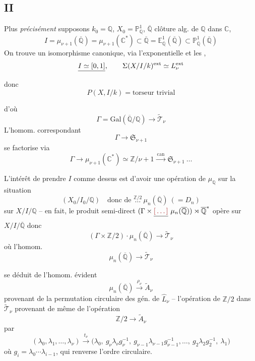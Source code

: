 \documentclass[11pt,a4paper]{article}
\begin{document}
\subsection*{II}

Plus \emph{précisément} supposons $k_{0} = \mathbb{Q}$,
$X_{0} = \mathbb{P}^{1}_{\mathbb{Q}}$, $\overline{\mathbb{Q}}$ clôture alg.
de $\mathbb{Q}$ dans $\mathbb{C}$,
\[
  I = \mu_{\nu+1}(\overline{\mathbb{Q}}) = \mu_{\nu+1}(\mathbb{C}^{*})
  \subset \overline{\mathbb{Q}} = \mathbb{E}^{1}_{\overline{\mathbb{Q}}}(\overline{\mathbb{Q}})
  \subset \mathbb{P}^{1}_{\overline{\mathbb{Q}}}(\overline{\mathbb{Q}})
\]
On trouve un isomorphisme canonique, via l'exponentielle et les
,
\[
  \struck{I \simeq [0,1]},\qquad
  \Sigma(X/I/k)^{\mathrm{ext}} \simeq L_{\nu}^{\mathrm{ext}}
\]
donc
\[
  P(X, I/k) = \text{torseur trivial}
\]

d'où
\[
  \Gamma = \mathrm{Gal}(\overline{\mathbb{Q}}/\mathbb{Q}) \longrightarrow \widetilde{\mathcal{T}}_{\nu}
\]
L'homom. correspondant
\[
  \Gamma \to \mathfrak{S}_{\nu+1}
\]
se factorise via
\[
  \Gamma \to \mu_{\nu+1}(\mathbb{C}^{*}) \simeq \mathbb{Z}/\nu{+}1
  \xrightarrow{\ \mathrm{can}\ } \mathfrak{S}_{\nu+1}\ \dots
\]

L'intérêt de prendre $I$ comme dessus est d'avoir une opération
 de $\mu_{\mathbb{Q}}$ 
sur la situation
\[
  (X_{0}/I_{0}/\mathbb{Q})\quad \text{donc de } \overset{\mathbb{Z}/2}{\dots}\ \mu_{n}(\overline{\mathbb{Q}})\ (= D_{n})
\]
sur $X/I/\mathbb{Q}$ -- en fait, le produit semi-direct
$(\Gamma \times \struck{\ill{}}\ \mu_{n}(\overline{\mathbb{Q}}))
\rtimes \overline{\mathbb{Q}}^{*}$ opère sur $X/I/\overline{\mathbb{Q}}$ donc
\[
  (\Gamma \times \mathbb{Z}/2) \cdot \mu_{n}(\overline{\mathbb{Q}})
  \longrightarrow \widetilde{\mathcal{T}}_{\nu}
\]
où l'homom.
\[
  \mu_{n}(\overline{\mathbb{Q}}) \longrightarrow \widetilde{\mathcal{T}}_{\nu}
\]

se déduit de l'homom. évident
\[
  \mu_{n}(\overline{\mathbb{Q}}) \xrightarrow{\ \rho_{\nu}\ } \widetilde{A}_{\nu}
\]
provenant de la permutation circulaire des gén. de $\widehat{L}_{\nu}$ --
l'opération de $\mathbb{Z}/2$ dans $\widetilde{\mathcal{T}}_{\nu}$ provenant
de même de l'opération
\[
  \mathbb{Z}/2 \longrightarrow \widetilde{A}_{\nu}
\]
par
\[
  (\lambda_{0}, \lambda_{1}, \dots, \lambda_{\nu}) \xrightarrow{\ t_{\nu}\ }
  \bigl(\lambda_{0},\ g_{\nu}\lambda_{\nu}g_{\nu}^{-1},\
  g_{\nu-1}\lambda_{\nu-1}g_{\nu-1}^{-1}, \dots,\ g_{2}\lambda_{2}g_{2}^{-1},\ \lambda_{1}\bigr)
\]
où $g_{i} = \lambda_{0} \cdots \lambda_{i-1}$, qui renverse l'ordre
circulaire.
\end{document}
